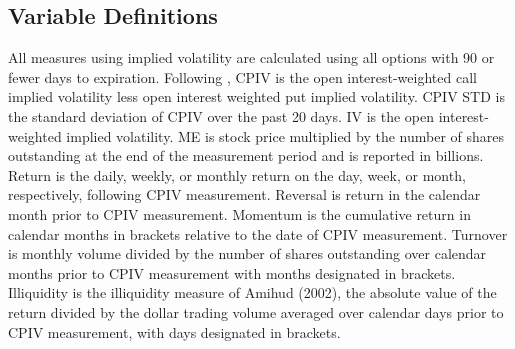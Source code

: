 \subsection{Variable Definitions}
All measures using implied volatility are calculated using all options with 90 or fewer days to expiration. Following \cite{cremers2010deviations}, CPIV is the open interest-weighted call implied volatility less open interest weighted put implied volatility. CPIV STD is the standard deviation of CPIV over the past 20 days. IV is the open interest-weighted implied volatility. ME is stock price multiplied by the number of shares outstanding at the end of the measurement period and is reported in billions. Return is the daily, weekly, or monthly return on the day, week, or month, respectively, following CPIV measurement. Reversal is return in the calendar month prior to CPIV measurement. Momentum is the cumulative return in calendar months in brackets relative to the date of CPIV measurement. Turnover is monthly 
volume divided by the number of shares outstanding over calendar months prior to CPIV measurement with months designated in brackets. Illiquidity is the illiquidity measure of Amihud (2002), the absolute value of the return divided by the dollar trading volume averaged over calendar days prior to CPIV measurement, with days designated in brackets.


